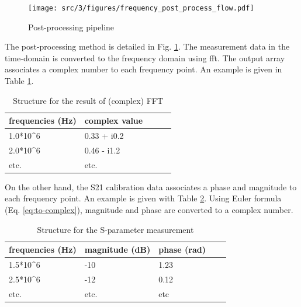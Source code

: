 \begin{figure}[!h]
  \centering
  \texttt{[image: src/3/figures/frequency\_post\_process\_flow.pdf]}
  \caption{Post-processing pipeline}
  \label{fig:postprocess-nfs-pipeline}
\end{figure}

The post-processing method is detailed in Fig. \ref{fig:postprocess-nfs-pipeline}.
The measurement data in the time-domain is converted to the frequency domain using \gls{fft}.
The output array associates a complex number to each frequency point.
An example is given in Table \ref{tab:complex-fft}.

\begin{table}[!h]
  \centering
  \begin{tabular}{@{}lllll@{}}
  \toprule
  frequencies (Hz)        & complex value                \\ \midrule
  1.0*10^6                & 0.33 + i0.2                  \\
  2.0*10^6                & 0.46 - i1.2                  \\
  etc.                    & etc.                         \\ \bottomrule
  \end{tabular}
  \caption{Structure for the result of (complex) FFT}
  \label{tab:complex-fft}
\end{table}

On the other hand, the S21 calibration data associates a phase and magnitude to each frequency point.
An example is given with Table \ref{tab:sparams}.
Using Euler formula (Eq. \ref{eq:to-complex}), magnitude and phase are converted to a complex number.

\begin{table}[!h]
  \centering
  \begin{tabular}{@{}lllll@{}}
  \toprule
  frequencies (Hz)          & magnitude (dB)         & phase (rad)     \\ \midrule
  1.5*10^6                  & -10                    & 1.23            \\
  2.5*10^6                  & -12                    & 0.12            \\
  etc.                      & etc.                   & etc             \\ \bottomrule
  \end{tabular}
  \caption{Structure for the S-parameter measurement}
  \label{tab:sparams}
\end{table}

